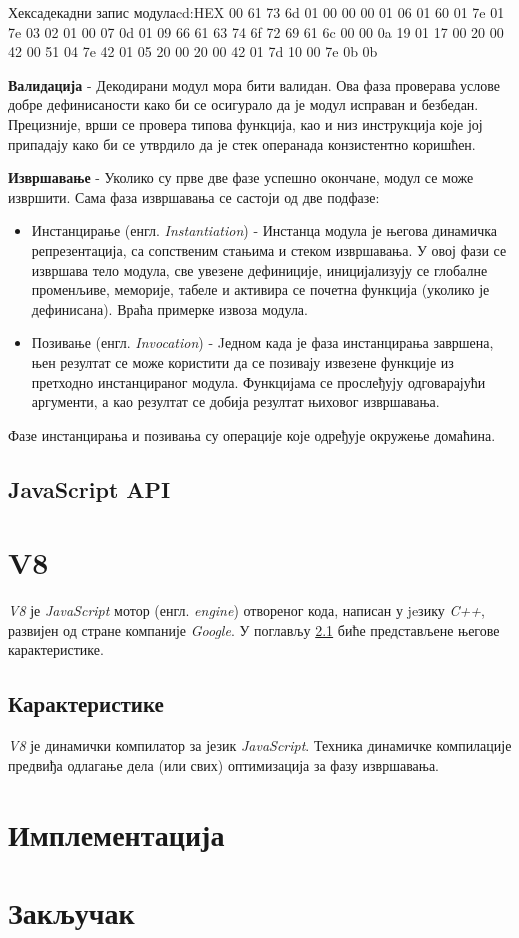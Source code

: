 \documentclass[12pt,oneside]{memoir}
\begin{document}
\begin{code}{Хексадекадни запис модула}{cd:HEX}
00 61 73 6d 01 00 00 00 01 06 01 60 01 7e 01 7e
03 02 01 00 07 0d 01 09 66 61 63 74 6f 72 69 61
6c 00 00 0a 19 01 17 00 20 00 42 00 51 04 7e 42
01 05 20 00 20 00 42 01 7d 10 00 7e 0b 0b 
\end{code}

\textbf{Валидација} - Декодирани модул мора бити валидан. Ова фаза проверава услове добре дефинисаности како би се
осигурало да је модул исправан и безбедан. Прецизније, врши се провера типова функција, као и низ инструкција које
јој припадају како би се утврдило да је стек операнада конзистентно коришћен.

\textbf{Извршавање} - Уколико су прве две фазе успешно окончане, модул се може извршити. Сама фаза извршавања се
састоји од две подфазе:

\begin{itemize}
	\item Инстанцирање (енгл. \textit{Instantiation}) - Инстанца модула је његова динамичка репрезентација, са
	сопственим стањима и стеком извршавања. У овој	фази се извршава тело модула, све увезене дефиниције,
	иницијализују се глобалне променљиве, меморије, табеле и активира се почетна функција (уколико је дефинисана).
	Враћа примерке извоза модула.
	\item Позивање (енгл. \textit{Invocation}) - Jедном када је фаза инстанцирања завршена, њен резултат се може
	користити да се позивају извезене функције из претходно инстанцираног модула. Функцијама се прослеђују
	одговарајући аргументи, а као резултат се добија резултат њиховог извршавања.
\end{itemize}
Фазе инстанцирања и позивања су операције које одређује окружење домаћина.

\section{JavaScript API} \label{chp:JSA}

\chapter{V8}

\textit{V8} је \textit{JavaScript} мотор (енгл. \textit{engine}) отвореног кода, написан у jeзику \textit{C++},
развијен од стране компаније \textit{Google}. У поглављу \ref{chp:CAR} биће представљене његове карактеристике.

\section{Карактеристике} \label{chp:CAR}

\textit{V8} је динамички компилатор за језик \textit{JavaScript}. Техника динамичке компилације предвиђа одлагање дела
(или свих) оптимизација за фазу извршавања.

\chapter{Имплементација}

\chapter{Закључак}

\literatura

\backmatter
\end{document}
